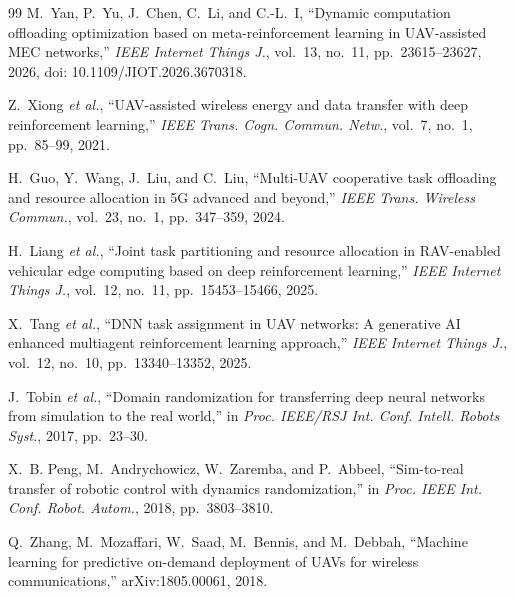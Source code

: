 \documentclass[journal]{IEEEtran}
\begin{document}
\begin{thebibliography}{99}
M.~Yan, P.~Yu, J.~Chen, C.~Li, and C.-L.~I, ``Dynamic computation offloading
optimization based on meta-reinforcement learning in UAV-assisted MEC
networks,'' \emph{IEEE Internet Things J.}, vol.~13, no.~11,
pp.~23615--23627, 2026, doi: 10.1109/JIOT.2026.3670318.

Z.~Xiong \emph{et al.}, ``UAV-assisted wireless energy and data transfer with
deep reinforcement learning,'' \emph{IEEE Trans. Cogn. Commun. Netw.},
vol.~7, no.~1, pp.~85--99, 2021.

H.~Guo, Y.~Wang, J.~Liu, and C.~Liu, ``Multi-UAV cooperative task offloading
and resource allocation in 5G advanced and beyond,'' \emph{IEEE Trans.
Wireless Commun.}, vol.~23, no.~1, pp.~347--359, 2024.

H.~Liang \emph{et al.}, ``Joint task partitioning and resource allocation in
RAV-enabled vehicular edge computing based on deep reinforcement learning,''
\emph{IEEE Internet Things J.}, vol.~12, no.~11, pp.~15453--15466, 2025.

X.~Tang \emph{et al.}, ``DNN task assignment in UAV networks: A generative
AI enhanced multiagent reinforcement learning approach,'' \emph{IEEE Internet
Things J.}, vol.~12, no.~10, pp.~13340--13352, 2025.

J.~Tobin \emph{et al.}, ``Domain randomization for transferring deep neural
networks from simulation to the real world,'' in \emph{Proc. IEEE/RSJ Int.
Conf. Intell. Robots Syst.}, 2017, pp.~23--30.

X.~B. Peng, M.~Andrychowicz, W.~Zaremba, and P.~Abbeel, ``Sim-to-real
transfer of robotic control with dynamics randomization,'' in \emph{Proc.
IEEE Int. Conf. Robot. Autom.}, 2018, pp.~3803--3810.

Q.~Zhang, M.~Mozaffari, W.~Saad, M.~Bennis, and M.~Debbah, ``Machine learning
for predictive on-demand deployment of UAVs for wireless communications,''
arXiv:1805.00061, 2018.
\end{thebibliography}
\end{document}
